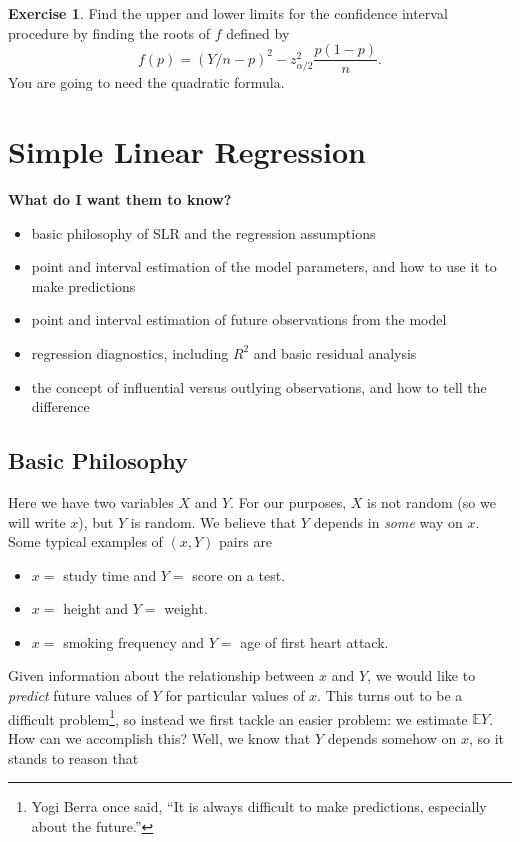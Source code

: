 \documentclass[]{book}
\providecommand{\tightlist}{%
  \setlength{\itemsep}{0pt}\setlength{\parskip}{0pt}}
\let\rmarkdownfootnote\footnote%
\def\footnote{\protect\rmarkdownfootnote}
\numberwithin{equation}{chapter}
\numberwithin{figure}{chapter}
\theoremstyle{plain}
\theoremstyle{definition}
\newtheorem{xca}{Exercise}[chapter]
\theoremstyle{remark}
\theoremstyle{definition}
\theoremstyle{definition}
\theoremstyle{remark}
\begin{document}
\bigskip

\begin{xca}
Find the upper and lower limits for the confidence interval procedure by
finding the roots of \(f\) defined by
\[ f(p)=\left(Y/n-p\right)^{2}-z_{\alpha/2}^{2}\frac{p(1-p)}{n}.  \] You
are going to need the quadratic formula.
\end{xca}

\chapter{Simple Linear Regression}\label{cha-simple-linear-regression}

\textbf{What do I want them to know?}

\begin{itemize}
\tightlist
\item
  basic philosophy of SLR and the regression assumptions
\item
  point and interval estimation of the model parameters, and how to use
  it to make predictions
\item
  point and interval estimation of future observations from the model
\item
  regression diagnostics, including \(R^{2}\) and basic residual
  analysis
\item
  the concept of influential versus outlying observations, and how to
  tell the difference
\end{itemize}

\section{Basic Philosophy}\label{sec-basic-philosophy}

Here we have two variables \(X\) and \(Y\). For our purposes, \(X\) is
not random (so we will write \(x\)), but \(Y\) is random. We believe
that \(Y\) depends in \emph{some} way on \(x\). Some typical examples of
\((x,Y)\) pairs are

\begin{itemize}
\tightlist
\item
  \(x =\) study time and \(Y =\) score on a test.
\item
  \(x =\) height and \(Y =\) weight.
\item
  \(x =\) smoking frequency and \(Y =\) age of first heart attack.
\end{itemize}

Given information about the relationship between \(x\) and \(Y\), we
would like to \emph{predict} future values of \(Y\) for particular
values of \(x\). This turns out to be a difficult problem\footnote{Yogi
  Berra once said, ``It is always difficult to make predictions,
  especially about the future.''}, so instead we first tackle an easier
problem: we estimate \(\mathbb{E}Y\). How can we accomplish this? Well,
we know that \(Y\) depends somehow on \(x\), so it stands to reason that
\end{document}

